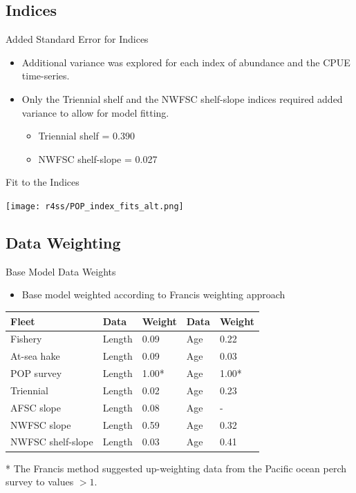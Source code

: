 \documentclass[pdf]{beamer}\usepackage[]{graphicx}\usepackage[]{color}
\begin{document}
\subsection{Indices}
\begin{frame}{Added Standard Error for Indices}
  \begin{itemize}
    \item Additional variance was explored for each index of abundance and the CPUE time-series.
    \item Only the Triennial shelf and the NWFSC shelf-slope indices required added variance to allow for model fitting.
      \begin{itemize}
        \item Triennial shelf = 0.390
        \item NWFSC shelf-slope = 0.027 
      \end{itemize}
  \end{itemize}
\end{frame}


\begin{frame}{Fit to the Indices}
  \begin{center}
    \texttt{[image: r4ss/POP\_index\_fits\_alt.png]}
  \end{center}
\end{frame}

\subsection{Data Weighting}
\begin{frame}{Base Model Data Weights}
  \begin{itemize}
    \item Base model weighted according to Francis weighting approach
  \end{itemize}
  
  \begin{table}[ht]
  \small
  \centering
  \begin{tabular}{p{1.2in}p{0.5in}p{0.5in}p{0.5in}p{0.5in}}
  Fleet & Data & Weight & Data & Weight \\ 
  \hline
  Fishery           & Length &  0.09  & Age & 0.22\\
  At-sea hake       & Length &  0.09  & Age & 0.03\\
  POP survey        & Length &  1.00* & Age & 1.00*\\
  Triennial         & Length &  0.02  & Age & 0.23\\
  AFSC slope        & Length &  0.08  & Age &    -\\
  NWFSC slope       & Length &  0.59  & Age & 0.32\\
  NWFSC shelf-slope & Length &  0.03  & Age & 0.41\\
  \hline
  \end{tabular}
  \end{table}
  * The Francis method suggested up-weighting data from the Pacific ocean perch survey to values $> 1$. 
\end{frame}
\end{document}
